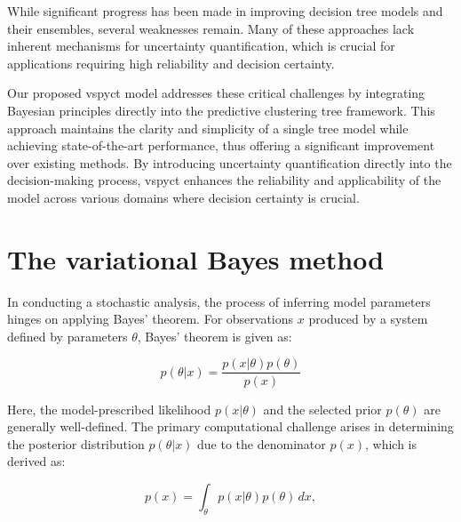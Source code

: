 \documentclass[3p,review,authoryear]{elsarticle}
\begin{document}
While significant progress has been made in improving decision tree models and their ensembles, several weaknesses remain.
Many of these approaches lack inherent mechanisms for uncertainty quantification, which is crucial for applications requiring high reliability and decision certainty.

Our proposed \gls{vspyct} model addresses these critical challenges by integrating Bayesian principles directly into the predictive clustering tree framework.
This approach maintains the clarity and simplicity of a single tree model while achieving state-of-the-art performance, thus offering a significant improvement over existing methods.
By introducing uncertainty quantification directly into the decision-making process, \gls{vspyct} enhances the reliability and applicability of the model across various domains where decision certainty is crucial.


\section{The variational Bayes method}


In conducting a stochastic analysis, the process of inferring model parameters hinges on applying Bayes' theorem.
For observations $x$ produced by a system defined by parameters $\theta$, Bayes' theorem is given as:

\begin{equation}
p(\theta|x)=\frac{p(x|\theta)p(\theta)}{p(x)}
\label{eq:bayes_rule}
\end{equation}

Here, the model-prescribed likelihood $p(x|\theta)$ and the selected prior $p(\theta)$ are generally well-defined.
The primary computational challenge arises in determining the posterior distribution $p(\theta|x)$ due to the denominator $p(x)$, which is derived as:

\begin{equation}
p(x)=\int_{\theta} p(x|\theta)p(\theta) \,dx,
\label{eq:evidence}
\end{equation}
\end{document}
